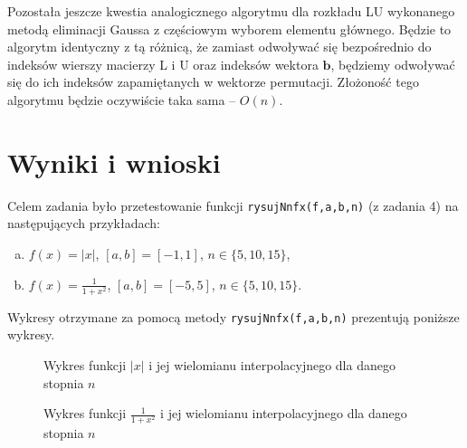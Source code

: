 \documentclass[]{article}
\newcommand{\vb}{\bm{b}}
\begin{document}
	Pozostała jeszcze kwestia analogicznego algorytmu dla rozkładu LU wykonanego metodą eliminacji Gaussa z częściowym wyborem elementu głównego. Będzie to algorytm identyczny z tą różnicą, że zamiast odwoływać się bezpośrednio do indeksów wierszy macierzy L i U oraz indeksów wektora $\vb$, będziemy odwoływać się do ich indeksów zapamiętanych w wektorze permutacji. Złożoność tego algorytmu będzie oczywiście taka sama -- $O(n)$.
	
	\section*{Wyniki i wnioski}
	
	Celem zadania było przetestowanie funkcji \texttt{rysujNnfx(f,a,b,n)} (z zadania 4) na następujących przykładach:
	\begin{enumerate}[(a)]
		\item $f(x) = |x|$, $[a, b] = [-1,1]$, $n \in \{5,10,15\}$,
		\item $f(x) = \frac{1}{1+x^2}$, $[a, b] = [-5,5]$, $n \in \{5,10,15\}$.
	\end{enumerate}
Wykresy otrzymane za pomocą metody \texttt{rysujNnfx(f,a,b,n)} prezentują poniższe wykresy.
\begin{figure}[h]
	\centering
	\caption*{Wykres funkcji $|x|$ i jej wielomianu interpolacyjnego dla danego stopnia $n$}
	\label{fig:3}
\end{figure}		

\begin{figure}[h]
	\centering
	\caption*{Wykres funkcji $\frac{1}{1+x^2}$ i jej wielomianu interpolacyjnego dla danego stopnia $n$}
	\label{fig:4}
\end{figure}
\end{document}
